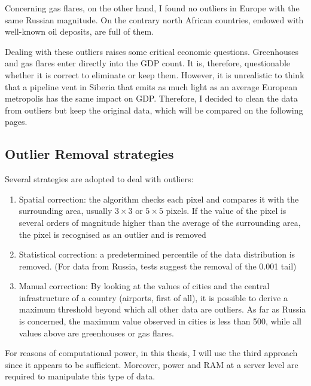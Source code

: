Concerning gas flares, on the other hand, I found no outliers in Europe with the same Russian magnitude. On the contrary north African countries, endowed with well-known oil deposits, are full of them. 

Dealing with these outliers raises some critical economic questions. Greenhouses and gas flares enter directly into the GDP count. It is, therefore, questionable whether it is correct to eliminate or keep them. However, it is unrealistic to think that a pipeline vent in Siberia that emits as much light as an average European metropolis has the same impact on GDP. Therefore, I decided to clean the data from outliers but keep the original data, which will be compared on the following pages. 

\subsection{Outlier Removal strategies}

Several strategies are adopted to deal with outliers:
\begin{enumerate}
    \item Spatial correction: the algorithm checks each pixel and compares it with the surrounding area, usually $3\times3$ or $5\times5$ pixels. If the value of the pixel is several orders of magnitude higher than the average of the surrounding area, the pixel is recognised as an outlier and is removed
    \item Statistical correction: a predetermined percentile of the data distribution is removed. (For data from Russia, tests suggest the removal of the 0.001 tail)
    \item Manual correction: By looking at the values of cities and the central infrastructure of a country (airports, first of all), it is possible to derive a maximum threshold beyond which all other data are outliers. As far as Russia is concerned, the maximum value observed in cities is less than 500, while all values above are greenhouses or gas flares.
\end{enumerate}

For reasons of computational power, in this thesis, I will use the third approach since it appears to be sufficient. Moreover, power and RAM at a server level are required to manipulate this type of data.
